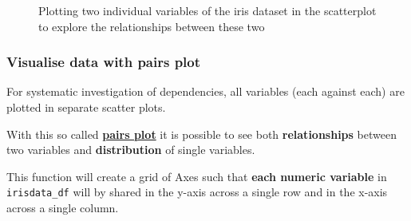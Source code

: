 \documentclass [oneside,10pt,a4paper,ngerman,BCOR10mm,headsepline,parindent,final]{scrartcl}
\begin{document}
    \begin{figure}
        \begin{center}\end{center}
        \caption{Plotting two individual variables of the iris dataset in the scatterplot to explore the relationships between these two}
        \label{fig:scatter_plot}
    \end{figure}
    
    \hypertarget{visualise-data-with-pairs-plot}{%
\subsubsection{\texorpdfstring{Visualise data with \textbf{pairs
plot}}{Visualise data with pairs plot}}\label{visualise-data-with-pairs-plot}}

For systematic investigation of dependencies, all variables (each
against each) are plotted in separate scatter plots.

With this so called
\textbf{\href{https://vita.had.co.nz/papers/gpp.pdf}{pairs plot}} it is
possible to see both \textbf{relationships} between two variables and
\textbf{distribution} of single variables.

This function will create a grid of Axes such that \textbf{each numeric
variable} in \texttt{irisdata\_df} will by shared in the y-axis across a
single row and in the x-axis across a single column.
\end{document}
